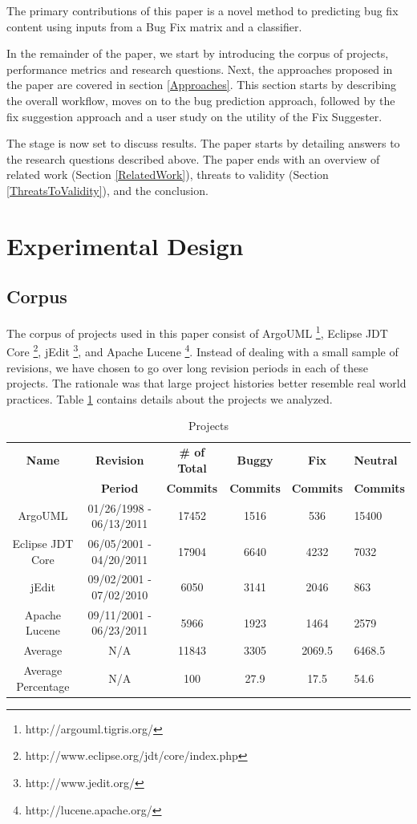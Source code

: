 \documentclass[conference]{IEEEtran}
\providecommand{\tabularnewline}{\\}
\begin{document}
The primary contributions of this paper is a novel method to predicting bug fix content using inputs from a Bug Fix matrix and a classifier. 

In the remainder of the paper, we start by introducing the corpus of projects, performance metrics and research questions. Next, the approaches proposed in the paper are covered in section \ref{Approaches}. This section starts by describing the overall workflow, moves
on to the bug prediction approach, followed by the fix suggestion approach and a user study on the utility of the Fix Suggester.

The stage is now set to discuss results. The paper starts by detailing answers to the research questions
described above.
The paper ends with an overview of related work (Section \ref{RelatedWork}),
threats to validity (Section \ref{ThreatsToValidity}), and the conclusion.

\section{Experimental Design}
\subsection{Corpus}
\label{Corpus}
The corpus of projects used in this paper
consist of ArgoUML%
\footnote{http://argouml.tigris.org/%
}, Eclipse JDT Core%
\footnote{http://www.eclipse.org/jdt/core/index.php%
}, jEdit%
\footnote{http://www.jedit.org/%
}, and Apache Lucene%
\footnote{http://lucene.apache.org/%
}. Instead of dealing with a small sample of revisions, we have chosen
to go over long revision periods in each of these projects. The rationale
was that large project histories better resemble real world practices.
Table \ref{tab:projects} contains details about the projects we analyzed.


\begin{table}
\caption{Projects}

\begin{center}
\label{tab:projects}
\setlength{\extrarowheight}{2pt}

\begin{tabular}{cccccp{2.3cm}}
\hline 
\textbf{Name}  & \textbf{Revision}  & \textbf{\# of Total}& \textbf{Buggy}& \textbf{Fix}& \textbf{Neutral}\tabularnewline
& \textbf{Period}  &\textbf{Commits} & \textbf{Commits}&\textbf{Commits}&\textbf{Commits}\tabularnewline

\hline 
ArgoUML  & 01/26/1998 - 06/13/2011  & 17452 & 1516 & 536& 15400\tabularnewline
\hline 
Eclipse JDT Core  & 06/05/2001 - 04/20/2011  & 17904 & 6640 & 4232& 7032\tabularnewline
\hline 
jEdit  & 09/02/2001 - 07/02/2010  & 6050& 3141& 2046& 863\tabularnewline
\hline 
Apache Lucene  & 09/11/2001 - 06/23/2011  & 5966& 1923& 1464& 2579\tabularnewline
\hline
Average &N/A&11843&3305&2069.5&6468.5\tabularnewline
\hline
Average Percentage& N/A&100 &27.9&17.5&54.6\tabularnewline
\hline
\end{tabular}
\end{center}


\end{table}
\end{document}
